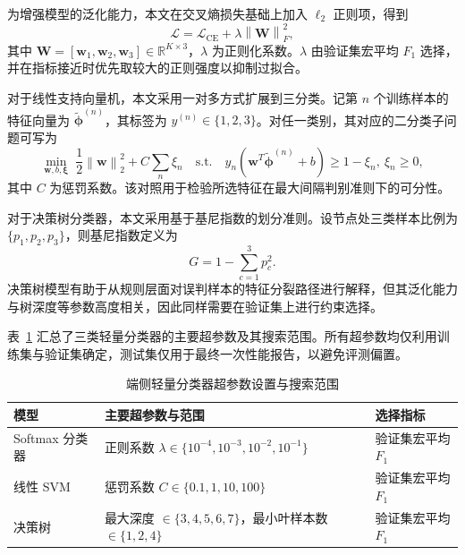 为增强模型的泛化能力，本文在交叉熵损失基础上加入 $\ell_2$ 正则项，得到
\begin{equation}
    \mathcal{L}=\mathcal{L}_{\mathrm{CE}}+\lambda\left\|\mathbf{W}\right\|_F^2,
\end{equation}
其中 $\mathbf{W}=[\mathbf{w}_1,\mathbf{w}_2,\mathbf{w}_3]\in\mathbb{R}^{K\times 3}$，$\lambda$ 为正则化系数。$\lambda$ 由验证集宏平均 $F_1$ 选择，并在指标接近时优先取较大的正则强度以抑制过拟合。

对于线性支持向量机，本文采用一对多方式扩展到三分类。记第 $n$ 个训练样本的特征向量为 $\tilde{\boldsymbol{\phi}}^{(n)}$，其标签为 $y^{(n)}\in\{1,2,3\}$。对任一类别，其对应的二分类子问题可写为
\begin{equation}
\min_{\mathbf{w},b,\boldsymbol{\xi}}\;\frac{1}{2}\left\|\mathbf{w}\right\|_2^2+C\sum_{n}\xi_n
\quad
\text{s.t.}\quad
y_n(\mathbf{w}^T\tilde{\boldsymbol{\phi}}^{(n)}+b)\ge 1-\xi_n,\ \xi_n\ge 0,
\end{equation}
其中 $C$ 为惩罚系数。该对照用于检验所选特征在最大间隔判别准则下的可分性。

对于决策树分类器，本文采用基于基尼指数的划分准则。设节点处三类样本比例为 $\{p_1,p_2,p_3\}$，则基尼指数定义为
\begin{equation}
    G=1-\sum_{c=1}^{3}p_c^2.
\end{equation}
决策树模型有助于从规则层面对误判样本的特征分裂路径进行解释，但其泛化能力与树深度等参数高度相关，因此同样需要在验证集上进行约束选择。

表~\ref{tab:ch3_edge_hyper} 汇总了三类轻量分类器的主要超参数及其搜索范围。所有超参数均仅利用训练集与验证集确定，测试集仅用于最终一次性能报告，以避免评测偏置。

\begin{table}[!htbp]
\centering
\small
\caption{端侧轻量分类器超参数设置与搜索范围}
\label{tab:ch3_edge_hyper}
\setlength{\tabcolsep}{6pt}
\renewcommand{\arraystretch}{1.15}
\begin{tabular}{p{3.1cm} p{7.2cm} p{2.8cm}}
\hline
模型 & 主要超参数与范围 & 选择指标 \\
\hline
Softmax 分类器 & 正则系数 $\lambda\in\{10^{-4},10^{-3},10^{-2},10^{-1}\}$ & 验证集宏平均 $F_1$ \\
线性 SVM & 惩罚系数 $C\in\{0.1,1,10,100\}$ & 验证集宏平均 $F_1$ \\
决策树 & 最大深度 $\in\{3,4,5,6,7\}$，最小叶样本数 $\in\{1,2,4\}$ & 验证集宏平均 $F_1$ \\
\hline
\end{tabular}
\end{table}

